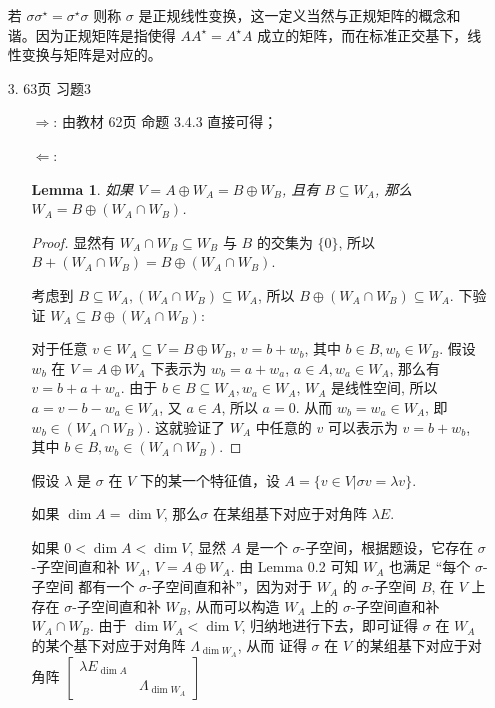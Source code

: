 \documentclass{article}
\newtheorem{lemma}[theorem]{Lemma}
\begin{document}
\begin{spacing}{1.5}
\begin{enumerate}
    若 $\sigma\sigma^\star = \sigma^\star\sigma$ 则称 $\sigma$ 是正规线性变换，这一定义当然与正规矩阵的概念和谐。因为正规矩阵是指使得 $AA^\star = A^\star A$ 成立的矩阵，而在标准正交基下，线性变换与矩阵是对应的。

    \item [3.] 63页 习题3 
    \begin{itemize}
        \item [$\Rightarrow$:] 由教材 62页 命题 3.4.3 直接可得；
        \item [$\Leftarrow$:]
        \begin{lemma}
            如果 $V = A\oplus W_A = B \oplus W_B$, 且有 $B\subseteq W_A$, 那么 $W_A = B\oplus (W_A \cap W_B)$.
        \end{lemma}
        \begin{proof}
            显然有 $W_A\cap W_B \subseteq W_B$ 与 $B$ 的交集为 $\{0\}$, 所以 $B + (W_A\cap W_B) = B\oplus (W_A \cap W_B)$.
            
            
            考虑到 $B\subseteq W_A, (W_A\cap W_B)\subseteq W_A$, 所以 $B\oplus(W_A\cap W_B) \subseteq W_A$. 下验证 $W_A\subseteq B\oplus(W_A\cap W_B)$:
            
            对于任意 $v\in W_A\subseteq V = B \oplus W_B$, $v = b + w_b$, 其中 $b\in B, w_b\in W_B$. 假设 $w_b$ 在 $V=A \oplus W_A$ 下表示为 $w_b = a + w_a$, $a\in A, w_a\in W_A$, 那么有 $v = b + a + w_a$. 由于 $b\in B\subseteq W_A, w_a\in W_A$, $W_A$ 是线性空间, 所以 $a = v - b - w_a \in W_A$, 又 $a\in A$, 所以 $a=0$. 从而 $w_b = w_a\in W_A$, 即 $w_b\in (W_A\cap W_B)$. 这就验证了 $W_A$ 中任意的 $v$ 可以表示为 $v = b + w_b$, 其中 $b\in B, w_b\in(W_A\cap W_B)$.
        \end{proof}
        假设 $\lambda$ 是 $\sigma$ 在 $V$ 下的某一个特征值，设 $A=\{v\in V| \sigma v = \lambda v\}$. 
        
        如果 $\dim A = \dim V$, 那么$\sigma$ 在某组基下对应于对角阵 $\lambda E$. 
        
        如果 $0 < \dim A < \dim V$, 显然 $A$ 是一个 $\sigma$-子空间，根据题设，它存在 $\sigma$-子空间直和补 $W_A$, $V = A\oplus W_A$. 由 Lemma 0.2 可知 $W_A$ 也满足 “每个 $\sigma$-子空间 都有一个 $\sigma$-子空间直和补”，因为对于 $W_A$ 的 $\sigma$-子空间 $B$, 在 $V$ 上存在 $\sigma$-子空间直和补 $W_B$, 从而可以构造 $W_A$ 上的 $\sigma$-子空间直和补 $W_A\cap W_B$. 由于 $\dim W_A < \dim V$, 归纳地进行下去，即可证得 $\sigma$ 在 $W_A$ 的某个基下对应于对角阵 $\Lambda_{\dim W_A}$, 从而 证得 $\sigma$ 在 $V$ 的某组基下对应于对角阵 $\left[\begin{array}{cc}\lambda E_{\dim A}&\\&\Lambda_{\dim W_A}\end{array}\right]$
    \end{itemize}


\end{enumerate}
\end{spacing}
\end{document}
